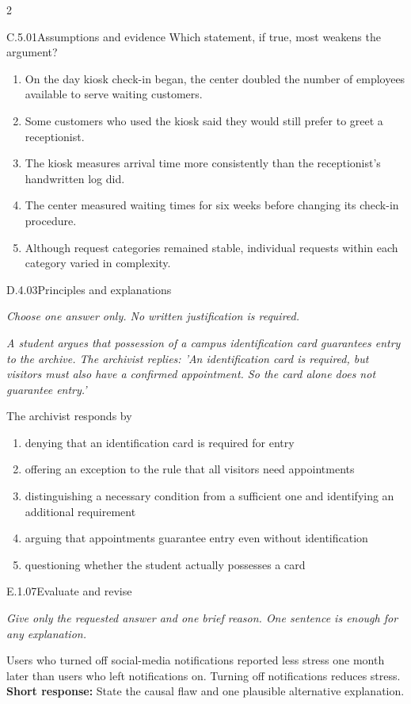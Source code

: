 \documentclass[9pt]{extarticle}
\newcommand{\choice}[1]{\item #1}
\begin{document}
\begin{multicols}{2}
\begin{DenseCoreProblem}{C.5.01}{Assumptions and evidence}
Which statement, if true, most weakens the argument?
\begin{enumerate}[label=(\alph*)]
  \choice{On the day kiosk check-in began, the center doubled the number of employees available to serve waiting customers.}
  \choice{Some customers who used the kiosk said they would still prefer to greet a receptionist.}
  \choice{The kiosk measures arrival time more consistently than the receptionist's handwritten log did.}
  \choice{The center measured waiting times for six weeks before changing its check-in procedure.}
  \choice{Although request categories remained stable, individual requests within each category varied in complexity.}
\end{enumerate}
\end{DenseCoreProblem}
\begin{DenseCoreProblem}{D.4.03}{Principles and explanations}
{\scriptsize\textit{Choose one answer only. No written justification is required.}\par}
\emph{A student argues that possession of a campus identification card guarantees entry to the archive. The archivist replies: 'An identification card is required, but visitors must also have a confirmed appointment. So the card alone does not guarantee entry.'}

The archivist responds by
\begin{enumerate}[label=(\alph*)]
  \choice{denying that an identification card is required for entry}
  \choice{offering an exception to the rule that all visitors need appointments}
  \choice{distinguishing a necessary condition from a sufficient one and identifying an additional requirement}
  \choice{arguing that appointments guarantee entry even without identification}
  \choice{questioning whether the student actually possesses a card}
\end{enumerate}
\end{DenseCoreProblem}
\begin{DenseCoreProblem}{E.1.07}{Evaluate and revise}
{\scriptsize\textit{Give only the requested answer and one brief reason. One sentence is enough for any explanation.}\par}
Users who turned off social-media notifications reported less stress one month later than users who left notifications on. Turning off notifications reduces stress.
\textbf{Short response:} State the causal flaw and one plausible alternative explanation.
\end{DenseCoreProblem}
\end{multicols}
\CoreWorkArea
\end{document}

